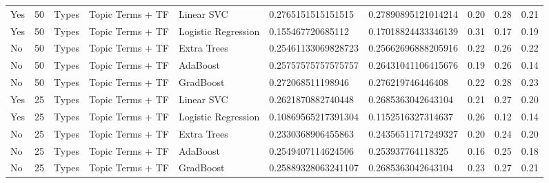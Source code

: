 \begin{table}[]
\begin{tabular}{@{}llllllllll@{}}
    Yes                 & 50              & Types                 & Topic Terms + TF      & Linear SVC          & 0.2765151515151515      & 0.27890895121014214    & 0.20               & 0.28            & 0.21              \\
    Yes                 & 50              & Types                 & Topic Terms + TF      & Logistic Regression & 0.155467720685112       & 0.17018824433346139    & 0.31               & 0.17            & 0.19              \\
    No                  & 50              & Types                 & Topic Terms + TF      & Extra Trees         & 0.25461133069828723     & 0.25662696888205916    & 0.22               & 0.26            & 0.22              \\
    No                  & 50              & Types                 & Topic Terms + TF      & AdaBoost            & 0.25757575757575757     & 0.26431041106415676    & 0.19               & 0.26            & 0.14              \\
    No                  & 50              & Types                 & Topic Terms + TF      & GradBoost           & 0.272068511198946       & 0.276219746446408      & 0.22               & 0.28            & 0.23              \\
    Yes                 & 25              & Types                 & Topic Terms + TF      & Linear SVC          & 0.2621870882740448      & 0.2685363042643104     & 0.21               & 0.27            & 0.20              \\
    Yes                 & 25              & Types                 & Topic Terms + TF      & Logistic Regression & 0.10869565217391304     & 0.1152516327314637     & 0.26               & 0.12            & 0.14              \\
    No                  & 25              & Types                 & Topic Terms + TF      & Extra Trees         & 0.2330368906455863      & 0.24356511717249327    & 0.20               & 0.24            & 0.20              \\
    No                  & 25              & Types                 & Topic Terms + TF      & AdaBoost            & 0.2549407114624506      & 0.253937764118325      & 0.16               & 0.25            & 0.18              \\
    No                  & 25              & Types                 & Topic Terms + TF      & GradBoost           & 0.25889328063241107     & 0.2685363042643104     & 0.23               & 0.27            & 0.21              \\

\end{tabular}
\end{table}
